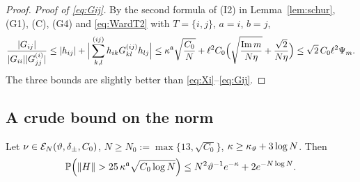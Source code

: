 \begin{proof}
\emph{Proof of \eqref{eq:Gij}.} By the second formula of (I2) in Lemma~\ref{lem:schur}, (G1), (C), (G4) and \eqref{eq:WardT2} with $T=\{i,j\}$, $a=i$, $b=j$,
\[
 \frac{|G_{ij}|}{|G_{ii}||G^{(i)}_{jj}|}\le|h_{ij}|+\Big|\sum^{(ij)}_{k,l}h_{ik}G^{(ij)}_{kl}h_{lj}\Big|\le\kappa^{\mathfrak{a}}\sqrt{\frac{C_0}N}+\ell^2C_0\Big(\sqrt{\frac{\operatorname{Im} m}{N\eta}}+\frac{\sqrt2}{N\eta}\Big)\le\sqrt2\,C_0\ell^2\Psi_m .
\]
The three bounds are slightly better than \eqref{eq:Xi}--\eqref{eq:Gij}.
\end{proof}
\subsection{A crude bound on the norm}
\begin{lemma}\label{lem:norm0}
Let $\nu\in\mathcal E_N(\vartheta,\delta_\pm,C_0)$, $N\ge N_0:=\max\{13,\sqrt{C_0}\}$, $\kappa\ge\kappa_\vartheta+3\log N$. Then
\[
 \PP\Big(\norm H>25\,\kappa^{\fa}\sqrt{C_0\log N}\Big)\le N^2\vth^{-1}e^{-\kappa}+2e^{-N\log N}.
\]
\end{lemma}
